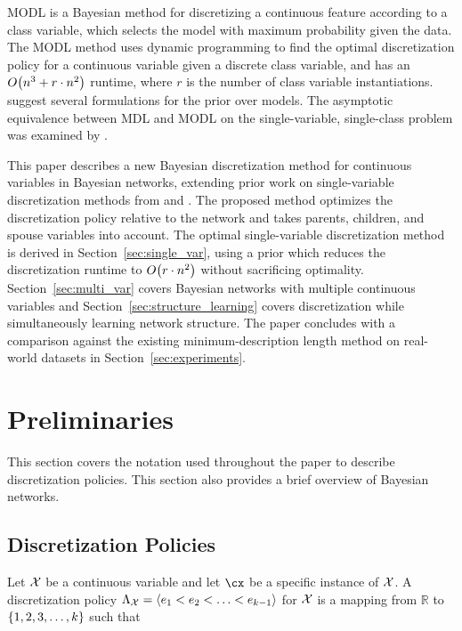 MODL \citep{Boulle_2006} is a Bayesian method for discretizing a continuous feature according to a class variable, which selects the model with maximum probability given the data.
The MODL method uses dynamic programming to find the optimal discretization policy for a continuous variable given a discrete class variable, and has an $\bigo\paren{n^3 + r \cdot n^2}$ runtime, where $r$ is the number of class variable instantiations.
\cite{Lustgarten_2011} suggest several formulations for the prior over models. The asymptotic equivalence between MDL and MODL on the single-variable, single-class problem was examined by \citet{VL_2000}.

This paper describes a new Bayesian discretization method for continuous variables in Bayesian networks, extending prior work on single-variable discretization methods from \citet{Boulle_2006} and \citet{Lustgarten_2011}.
The proposed method optimizes the discretization policy relative to the network and takes parents, children, and spouse variables into account.
The optimal single-variable discretization method is derived in Section~\ref{sec:single_var}, using a prior which reduces the discretization runtime to $\bigo\paren{r \cdot n^2}$ without sacrificing optimality.
Section~\ref{sec:multi_var} covers Bayesian networks with multiple continuous variables and Section~\ref{sec:structure_learning} covers discretization while simultaneously learning network structure.
The paper concludes with a comparison against the existing minimum-description length \citep{Friedman_1996} method on real-world datasets in Section~\ref{sec:experiments}.


\section{Preliminaries}
\label{sec:preliminaries}
This section covers the notation used throughout the paper to describe discretization policies.
This section also provides a brief overview of Bayesian networks.

\subsection{Discretization Policies}
\label{subsec:disc_policy}

Let $\mathcal{X}$ be a continuous variable and let $\cx$ be a specific instance of $\mathcal{X}$.
A discretization policy $\Lambda_{\mathcal{X}} = \langle e_1 < e_2 < \ldots < e_{k-1} \rangle$ for $\mathcal{X}$ is a mapping from $\mathbb{R}$ to $\curly{1,2,3,\ldots,k}$ such that


